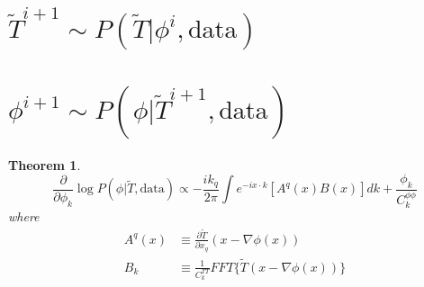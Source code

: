 \documentclass[noinfoline]{imsart}
\newtheorem{theorem}{Theorem}
\begin{document}
\section{$\widetilde T^{i+1}\sim P(\widetilde T |  \phi^{i},\text{data})$}

\section{$\phi^{i+1}\sim P(\phi | \widetilde T^{i+1},  \text{data})$}
\begin{theorem}
 \[\frac{\partial}{\partial \phi_k}\log P(\phi | \tilde T,  \text{data}) \propto -\frac{i k_q}{2\pi} \int e^{-i x\cdot k} [A^q(x)B(x)]dk + \frac{\phi_k}{C^{\phi\phi}_{k}}  \]
 where
 \begin{align}
 A^q(x) &\equiv \frac{\partial\tilde T}{\partial x_q}(x-\nabla \phi(x)) \\
 B_k &\equiv \frac{1}{C_k^{TT}} FFT\bigl\{\tilde T(x-\nabla \phi(x))\bigr\}
 \end{align}
\end{theorem}
\end{document}

